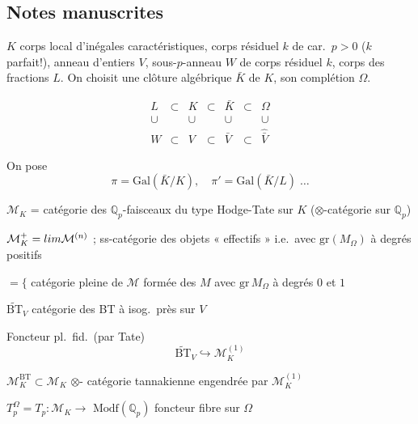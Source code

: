 \documentclass[11pt,a4paper]{article}
\begin{document}
\subsection*{Notes manuscrites}

\struck{\ill{}} $K$ corps local d'inégales caractéristiques, corps résiduel $k$
de car.\ $p > 0$ ($k$ parfait!), anneau d'entiers $V$, sous-$p$-anneau $W$ de
corps résiduel $k$, corps des fractions $L$. On choisit une clôture algébrique
$\bar{K}$ de $K$, son complétion $\Omega$.

\[
\begin{array}{ccccccc}
L & \subset & K & \subset & \bar{K} & \subset & \Omega \\
\cup & & \cup & & \cup & & \cup \\
W & \subset & V & \subset & \bar{V} & \subset & \hat{\bar{V}}
\end{array}
\]

On pose
\[
\pi = \mathrm{Gal}(\bar{K}/K), \quad \pi' = \mathrm{Gal}(\bar{K}/L) \;\ldots
\]

$\mathcal{M}_K$ = catégorie des $\mathbb{Q}_p$-faisceaux du type Hodge-Tate sur
$K$ ($\otimes$-catégorie sur $\mathbb{Q}_p$)

$\mathcal{M}^{+}_K = \varinjlim \mathcal{M}^{(n)}$ ; ss-catégorie des objets
« effectifs » i.e.\ avec  $\mathrm{gr}(M_\Omega)$
à degrés positifs

 $= \{$ \struck{\ill{}} catégorie pleine de
$\mathcal{M}$ formée des $M$ avec $\mathrm{gr}\, M_\Omega$ à degrés $0$ et $1$

$\widetilde{\mathrm{BT}}_V$ catégorie des BT à isog.\ près sur $V$

Foncteur pl.\ fid.\ (par Tate)
\[
\widetilde{\mathrm{BT}}_V \hookrightarrow \mathcal{M}^{(1)}_K
\]

$\mathcal{M}^{\mathrm{BT}}_K \subset \mathcal{M}_K$ $\otimes$-\struck{\ill{}}
catégorie tannakienne engendrée par $\mathcal{M}^{(1)}_K$

$T^{\Omega}_p = T_p : \mathcal{M}_K \to$ \struck{\ill{}} $\mathrm{Modf}(\mathbb{Q}_p)$
\quad foncteur fibre sur $\Omega$
\end{document}
